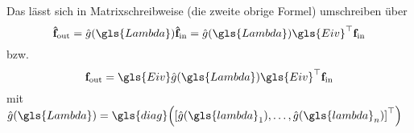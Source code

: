 Das lässt sich in Matrixschreibweise (die zweite obrige Formel) umschreiben über
\begin{equation}
  \ve{\hat f}_{\mathrm{out}} = \hat g\left(\gls{Lambda}\right) \ve{\hat f}_{\mathrm{in}} = \hat g\left(\gls{Lambda}\right)\gls{Eiv}^{\top}\ve{f}_{\mathrm{in}}
\end{equation}
bzw.
\begin{equation}
  \ve{f}_{\mathrm{out}} = \gls{Eiv}\hat g\left(\gls{Lambda}\right)\gls{Eiv}^{\top}\ve{f}_{\mathrm{in}}
\end{equation}
mit $\hat g\left(\gls{Lambda}\right) = \gls{diag}\left({\left[\hat g\left(\gls{lambda}_1\right), \ldots, \hat g\left(\gls{lambda}_n\right)\right]}^{\top}\right)$
